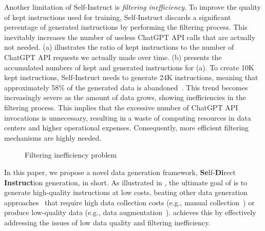 Another limitation of Self-Instruct is \textit{filtering inefficiency}. 
To improve the quality of kept instructions used for training,
Self-Instruct discards a significant percentage of generated instructions
by performing the filtering process. This inevitably increases the number of 
useless ChatGPT API calls that are actually not needed.
(a) illustrates the ratio of kept instructions 
to the number of ChatGPT API requests we actually made over time.
(b) presents the accumulated numbers of kept and 
generated instructions for (a).
To create 10K kept instructions,
Self-Instruct needs to generate 24K
instructions, meaning that approximately 58\% of the generated data
is abandoned~\cite{self-instruct}.
This trend becomes increasingly severe as the amount of data grows,
showing inefficiencies in the filtering process.
This implies that the excessive number of ChatGPT API invocations
is unnecessary, 
resulting in a waste of computing resources in data centers 
and higher operational expenses.
Consequently, more efficient filtering mechanisms are highly needed.
\begin{figure}[t]%
	\centering
	\hspace{3pt}
	\caption{Filtering inefficiency problem}%
	\label{fig:api-inefficiency}%
\end{figure}




In this paper, we propose a novel data generation
framework, \textbf{Se}lf-\textbf{Di}rect
\textbf{Instruct}ion generation, \ours{} in short.
As illustrated in , the ultimate goal of \ours{}
is to generate high-quality instructions at low costs, beating other %
data generation approaches~\cite{self-instruct,sitgpt4,alpaca}
that require high data collection costs (e.g., manual collection~\cite{llama3}) or 
produce low-quality data (e.g., data augmentation~\cite{backtranslation, eda}).
\ours{} achieves this by effectively addressing 
the issues of low data quality and filtering inefficiency.

